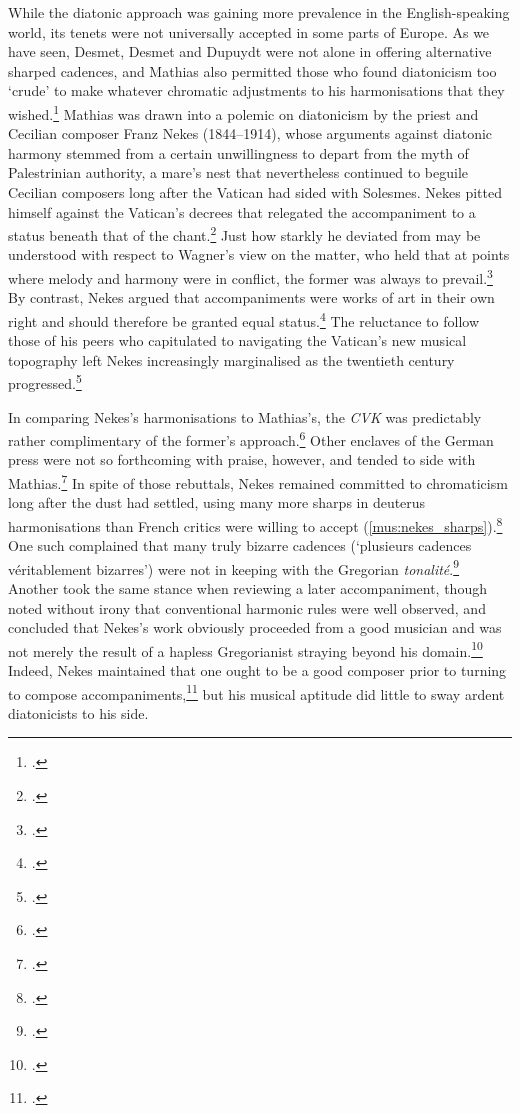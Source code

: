 While the diatonic approach was gaining more prevalence in the English-speaking world, its tenets were not universally accepted in some parts of Europe.
As we have seen, Desmet, Desmet and Dupuydt were not alone in offering alternative sharped cadences, and Mathias also permitted those who found diatonicism too `crude' to make whatever chromatic adjustments to his harmonisations that they wished.\footcite[unpaginated introduction]{MathiasOrganumcomitansad1906}
Mathias was drawn into a polemic on diatonicism by the priest and Cecilian composer Franz Nekes (1844--1914), whose arguments against diatonic harmony stemmed from a certain unwillingness to depart from the myth of Palestrinian authority, a mare's nest that nevertheless continued to beguile Cecilian composers long after the Vatican had sided with Solesmes.
Nekes pitted himself against the Vatican's decrees that relegated the accompaniment to a status beneath that of the chant.\footcite[564]{T.ReviewNekesKyriale1906}
Just how starkly he deviated from \tls{} may be understood with respect to Wagner's view on the matter, who held that at points where melody and harmony were in conflict, the former was always to prevail.\footcite[p.~v]{WagnerOrdinariumMissaejuxta1905}
By contrast, Nekes argued that accompaniments were works of art in their own right and should therefore be granted equal status.\footcite[104]{NekesUeberChoralbegleitung1904}
The reluctance to follow those of his peers who capitulated to navigating the Vatican's new musical topography left Nekes increasingly marginalised as the twentieth century progressed.\footcite[83--4]{WagnerFranzNekesund1969}

In comparing Nekes's harmonisations to Mathias's, the \emph{CVK} was predictably rather complimentary of the former's approach.\footnote{.}
Other enclaves of the German press were not so forthcoming with praise, however, and tended to side with Mathias.\footcite[156]{Literarisches1905}
In spite of those rebuttals, Nekes remained committed to chromaticism long after the dust had settled, using many more sharps in deuterus harmonisations than French critics were willing to accept (\cref{mus:nekes_sharps}).\footcite[94]{NekesKyrialesiveOrdinarium1912}
One such complained that many truly bizarre cadences (`plusieurs cadences véritablement bizarres') were not in keeping with the Gregorian \emph{tonalité}.\footcite[178--9]{Bibliographiegregorienneeditions1906}
Another took the same stance when reviewing a later accompaniment, though noted without irony that conventional harmonic rules were well observed, and concluded that Nekes's work obviously proceeded from a good musician and was not merely the result of a hapless Gregorianist straying beyond his domain.\footcite[99]{ReviewNekesMissae1910}
Indeed, Nekes maintained that one ought to be a good composer prior to turning to compose accompaniments,\footcite[104]{NekesUeberChoralbegleitung1904} but his musical aptitude did little to sway ardent diatonicists to his side.

